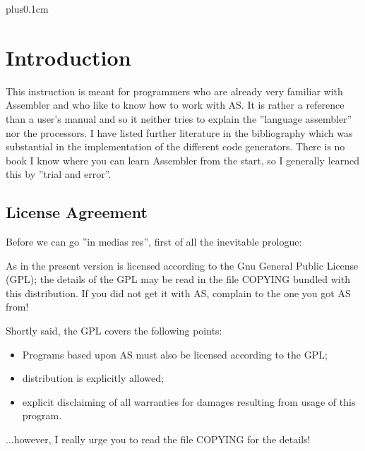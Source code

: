 \documentclass[12pt,twoside]{report}
\begin{document}
{\parskip 0cm plus0.1cm \tableofcontents}


\cleardoublepage
\chapter{Introduction}

This instruction is meant for programmers who are already very familiar
with Assembler and who like to know how to work with AS.  It is rather a
reference than a user's manual and so it neither tries to explain the
''language assembler'' nor the processors.  I have listed further
literature in the bibliography which was substantial in the implementation
of the different code generators.  There is no book I know where you can
learn Assembler from the start, so I generally learned this by ''trial and
error''.


\section{License Agreement}
\label{SectLicense}

Before we can go ''in medias res'', first of all the inevitable prologue:

As in the present version is licensed according to the Gnu General Public
License (GPL); the details of the GPL may be read in the file COPYING
bundled with this distribution.  If you did not get it with AS, complain
to the one you got AS from!

Shortly said, the GPL covers the following points:
\begin{itemize}
\item{Programs based upon AS must also be licensed according to the GPL;}
\item{distribution is explicitly allowed;}
\item{explicit disclaiming of all warranties for damages resulting from
      usage of this program.}
\end{itemize}
...however, I really urge you to read the file COPYING for the details!
\end{document}
